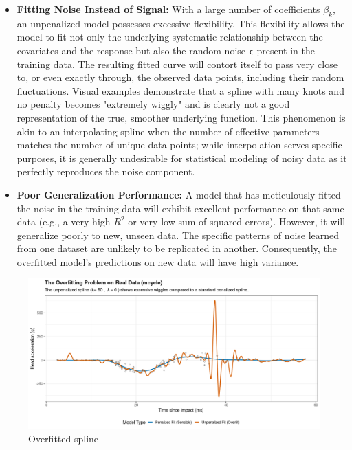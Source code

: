 \documentclass[11pt, a4paper]{article}
\begin{document}
\begin{itemize}
 \item \textbf{Fitting Noise Instead of Signal:} With a large number of coefficients $\beta_k$, an unpenalized model possesses excessive flexibility. This flexibility allows the model to fit not only the underlying systematic relationship between the covariates and the response but also the random noise $\boldsymbol{\epsilon}$ present in the training data. The resulting fitted curve will contort itself to pass very close to, or even exactly through, the observed data points, including their random fluctuations. Visual examples demonstrate that a spline with many knots and no penalty becomes "extremely wiggly" and is clearly not a good representation of the true, smoother underlying function. This phenomenon is akin to an interpolating spline when the number of effective parameters matches the number of unique data points; while interpolation serves specific purposes, it is generally undesirable for statistical modeling of noisy data as it perfectly reproduces the noise component.

 \item \textbf{Poor Generalization Performance:} A model that has meticulously fitted the noise in the training data will exhibit excellent performance on that same data (e.g., a very high $R^2$ or very low sum of squared errors). However, it will generalize poorly to new, unseen data. The specific patterns of noise learned from one dataset are unlikely to be replicated in another. Consequently, the overfitted model's predictions on new data will have high variance.
\end{itemize}
 \begin{figure}[h!]
  \centering
  \includegraphics[width=\linewidth]{overfit.png}
  \caption{Overfitted spline}
  \label{fig:enter-label-3}
 \end{figure}
\end{document}
